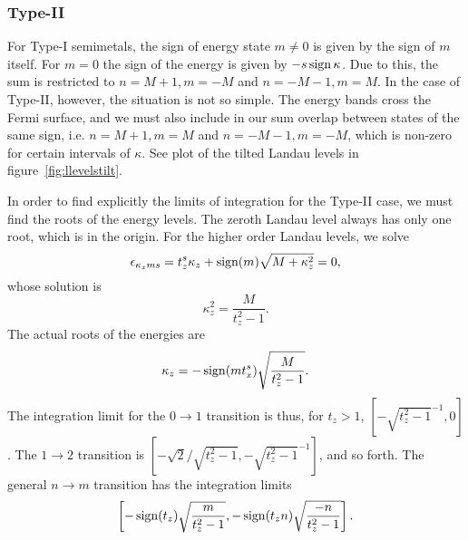 \subsubsection{Type-II}
For Type-I semimetals, the sign of energy state \( m \neq 0 \) is given by the sign of \( m \) itself.
For \( m = 0 \) the sign of the energy is given by \( -s \operatorname{sign}{\kappa } \).
Due to this, the sum is restricted to \( n=M+1, m=-M \) and \( n=-M-1, m=M \).
In the case of Type-II, however, the situation is not so simple.
The energy bands cross the Fermi surface, and we must also include in our sum overlap between states of the same sign, i.e. \( n=M+1, m=M \) and \( n=-M-1, m=-M \), which is non-zero for certain intervals of \( \kappa  \).
See plot of the tilted Landau levels in figure~\ref{fig:llevelstilt}.


In order to find explicitly the limits of integration for the Type-II case, we must find the roots of the energy levels.
The zeroth Landau level always has only one root, which is in the origin.
For the higher order Landau levels, we solve
\begin{equation}
  \label{eq:127}
  \epsilon_{\kappa_z m s } = t_z^s \kappa_z + \operatorname{sign}(m) \sqrt{M + \kappa_{z} ^2} = 0,
\end{equation}
whose solution is
\[
\kappa_z^2 = \frac{M}{t_{z}^2 - 1}.
\]
The actual roots of the energies are
\begin{equation}
  \label{eq:128}
  \kappa_z = -\operatorname{sign}(m t^s_x) \sqrt{\frac{M}{t_{z}^2 - 1}}.
\end{equation}
The integration limit for the \( 0 \to 1 \) transition is thus, for \( t_z > 1 \), \( [-\sqrt{t_z^2 - 1 }^{-1}, 0] \).
The \( 1\to 2 \) transition is \( [-\sqrt{2} /\sqrt{t_z^2 - 1}, -\sqrt{t_z^2 - 1 }^{-1}] \), and so forth.
The general \( n \to m \) transition has the integration limits
\[
  \left[-\operatorname{sign}(t_z) \sqrt{\frac{m}{t_{z}^2 - 1}}, -\operatorname{sign}(t_z n) \sqrt{\frac{-n}{t_{z}^2 -1}} \right].
\]

